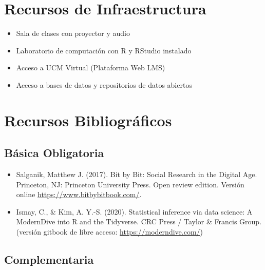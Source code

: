 \documentclass[11pt,letter,]{article}
\providecommand{\tightlist}{%
  \setlength{\itemsep}{0pt}\setlength{\parskip}{0pt}}
\begin{document}
\hypertarget{recursos-de-infraestructura}{%
\section{Recursos de
Infraestructura}\label{recursos-de-infraestructura}}

\begin{itemize}
\tightlist
\item
  Sala de clases con proyector y audio
\item
  Laboratorio de computación con R y RStudio instalado
\item
  Acceso a UCM Virtual (Plataforma Web LMS)
\item
  Acceso a bases de datos y repositorios de datos abiertos
\end{itemize}

\hypertarget{recursos-bibliogruxe1ficos}{%
\section{Recursos Bibliográficos}\label{recursos-bibliogruxe1ficos}}

\hypertarget{buxe1sica-obligatoria}{%
\subsection{Básica Obligatoria}\label{buxe1sica-obligatoria}}

\begin{itemize}
\tightlist
\item
  Salganik, Matthew J. (2017). Bit by Bit: Social Research in the
  Digital Age. Princeton, NJ: Princeton University Press. Open review
  edition. Versión online \url{https://www.bitbybitbook.com/}.
\item
  Ismay, C., \& Kim, A. Y.-S. (2020). Statistical inference via data
  science: A ModernDive into R and the Tidyverse. CRC Press / Taylor \&
  Francis Group. (versión gitbook de libre acceso:
  \url{https://moderndive.com/})
\end{itemize}

\hypertarget{complementaria}{%
\subsection{Complementaria}\label{complementaria}}
\end{document}
